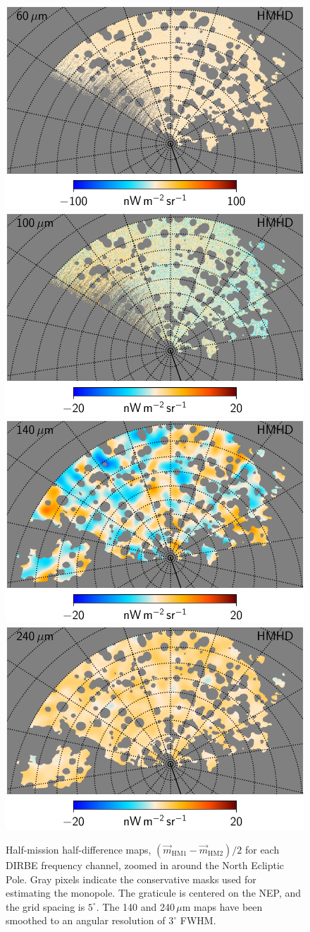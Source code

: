 \documentclass{aa}
\newcommand{\m}[0]{\vec{m}}
\begin{document}
\begin{figure}
  \includegraphics[width=0.376\linewidth]{figs/CGDR2_07_hmhd_fullres_v4.pdf}\hspace*{5mm}
  \includegraphics[width=0.376\linewidth]{figs/CGDR2_08_hmhd_fullres_v4.pdf}\\
  \includegraphics[width=0.376\linewidth]{figs/CGDR2_09_hmhd_fullres_3deg_v4.pdf}\hspace*{5mm}
  \includegraphics[width=0.376\linewidth]{figs/CGDR2_10_hmhd_fullres_3deg_v4.pdf}
  \caption{Half-mission half-difference maps, $(\m_{\mathrm{HM1}}-\m_{\mathrm{HM2}})/2$ for each DIRBE frequency channel, zoomed in around the North Ecliptic Pole. Gray pixels indicate the conservative masks used for estimating the monopole. The graticule is centered on the NEP, and the grid spacing is $5^{\circ}$. The 140 and 240\,$\mu\mathrm{m}$ maps have been smoothed to an angular resolution of $3^{\circ}$ FWHM.}
  \label{fig:hmhd_zoom}
\end{figure}
\end{document}
